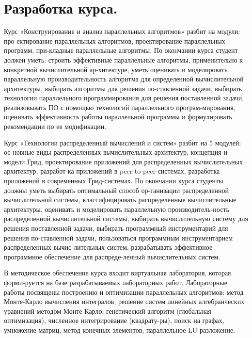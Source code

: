 \documentclass[11pt]{article}
\begin{document}
\section{Разработка курса.}
Курс «Конструирование и анализ параллельных алгоритмов» разбит на модули: про-ектирование параллельных алгоритмов, проектирование параллельных программ, при-кладные параллельные алгоритмы. По окончании курса студент должен уметь: строить эффективные параллельные алгоритмы, применительно к конкретной вычислительной ар-хитектуре, уметь оценивать и моделировать параллельную производительность алгоритма для определенной вычислительной архитектуры, выбирать алгоритмы для решения по-ставленной задачи, выбирать технологии параллельного программирования для решения поставленной задачи, реализовывать ПО с помощью технологий параллельного програм-мирования, оценивать эффективность работы параллельной программы и формулировать рекомендации по ее модификации.
\par Курс «Технологии распределенный вычислений и систем» разбит на 5 модулей: ос-новные виды распределенных вычислительных архитектур, концепция и модели Грид, проектирование приложений для распределенных вычислительных архитектур, разработ-ка приложений в peer-to-peer-системах, разработка приложений в современных Грид-системах. По окончании курса студенты должны уметь выбирать оптимальный способ ор-ганизации распределенной вычислительной системы, классифицировать распределенные вычислительные архитектуры, оценивать и моделировать параллельную производитель-ность распределенной вычислительной системы, выбирать вычислительную систему для решения поставленной задачи, выбирать программный инструментарий для решения по-ставленной задачи, пользоваться программным инструментарием распределенных вычис-лительных систем, разрабатывать эффективное программное обеспечение для распреде-ленный вычислительных систем.
\par В методическое обеспечение курса входит виртуальная лаборатория, которая форми-руется на базе разрабатываемых лабораторных работ. Лабораторные работы посвящены построению и оптимизации параллельных алгоритмов: метод Монте-Карло вычисления интегралов, решение систем линейных алгебраических уравнений методом Монте-Карло, генетический алгоритм (глобальная оптимизация), численное интегрирование (квадрату-ры), поиск на графах, умножение матриц, метод конечных элементов, параллельное LU-разложение.
\end{document}
